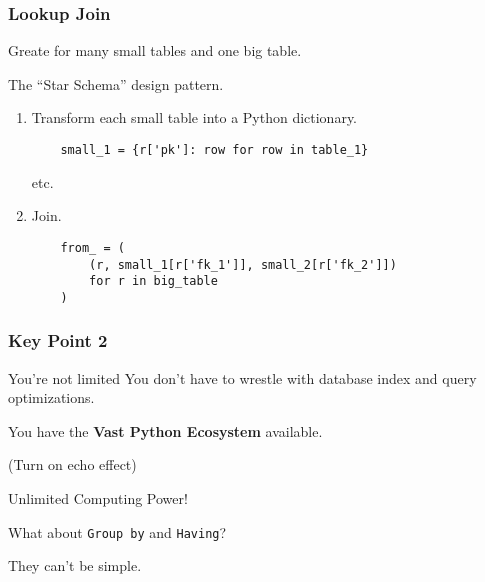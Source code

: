 \documentclass{beamer}
\begin{document}
\begin{frame}[fragile]
    \frametitle{Lookup Join}

    Greate for many small tables and one big table.

    The ``Star Schema'' design pattern.

    \vspace{1em}
    \begin{enumerate}

    \item Transform each small table into a Python dictionary.
    \begin{verbatim}
    small_1 = {r['pk']: row for row in table_1}
    \end{verbatim}
    etc.

    \item Join.
    \begin{verbatim}
    from_ = (
        (r, small_1[r['fk_1']], small_2[r['fk_2']])
        for r in big_table
    )
    \end{verbatim}

    \end{enumerate}

\end{frame}

\begin{frame}
    \frametitle{Key Point 2}

    \begin{block}{You're not limited}
        You don't have to wrestle with database index and query optimizations.

        \vspace{1em}
        You have the \textbf{Vast Python Ecosystem} available.
        \pause

        \vspace{1em}
        (Turn on echo effect)

        \Large{Unlimited Computing Power!}
    \end{block}
    \pause

    \vspace{1em}

    What about \texttt{Group by} and \texttt{Having}?

    They can't be simple.
\end{frame}
\end{document}
